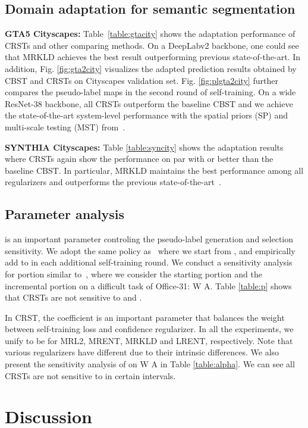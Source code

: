 \documentclass[10pt,twocolumn,letterpaper]{article}
\theoremstyle{plain}
\begin{document}
\subsection{Domain adaptation for semantic segmentation}
\noindent\textbf{GTA5  Cityscapes:} Table~\ref{table:gtacity} shows the adaptation performance of CRSTs and other comparing methods. On a DeepLabv2 backbone, one could see that MRKLD achieves the best result outperforming previous state-of-the-art. In addition, Fig. \ref{fig:gta2city} visualizes the adapted prediction results obtained by CBST and CRSTs on Cityscapes validation set. Fig. \ref{fig:plgta2city} further compares the pseudo-label maps in the second round of self-training. On a wide ResNet-38 backbone, all CRSTs outperform the baseline CBST and we achieve the state-of-the-art system-level performance with the spatial priors (SP) and multi-scale testing (MST) from~\cite{Zou_2018_ECCV}.

\noindent\textbf{SYNTHIA  Cityscapes:} Table \ref{table:syncity} shows the adaptation results where CRSTs again show the performance on par with or better than the baseline CBST. In particular, MRKLD maintains the best performance among all regularizers and outperforms the previous state-of-the-art~\cite{Zou_2018_ECCV}.

\subsection{Parameter analysis}
 is an important parameter controling the pseudo-label generation and selection sensitivity. We adopt the same  policy as~\cite{Zou_2018_ECCV} where we start  from , and empirically add  to  in each additional self-training round. We conduct a sensitivity analysis for portion  similar to~\cite{Zou_2018_ECCV}, where we consider the starting portion  and the incremental portion  on a difficult task of Office-31: W  A. Table \ref{table:p} shows that CRSTs are not sensitive to  and  . 

In CRST, the coefficient  is an important parameter that balances the weight between self-training loss and confidence regularizer. In all the experiments, we unify  to be  for MRL2, MRENT, MRKLD and LRENT, respectively. Note that various regularizers have different  due to their intrinsic differences. We also present the sensitivity analysis of  on W  A in Table \ref{table:alpha}. We can see all CRSTs are not sensitive to  in certain intervals. 
\section{Discussion}\label{sec:discuss}
\end{document}
